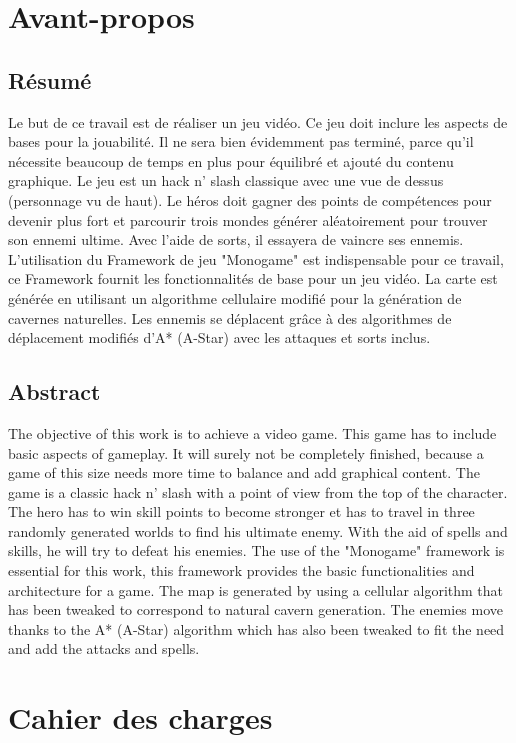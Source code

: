 \documentclass[11pt, a4paper, oneside]{report}
\begin{document}
\chapter{Avant-propos}
\section{Résumé}
Le but de ce travail est de réaliser un jeu vidéo. Ce jeu doit inclure les aspects de bases pour la jouabilité. Il ne sera bien évidemment pas terminé, parce qu'il nécessite beaucoup de temps en plus pour équilibré et ajouté du contenu graphique. Le jeu est un hack n' slash classique avec une vue de dessus (personnage vu de haut). Le héros doit gagner des points de compétences pour devenir plus fort et parcourir trois mondes générer aléatoirement pour trouver son ennemi ultime. Avec l'aide de sorts, il essayera de vaincre ses ennemis. L'utilisation du Framework de jeu "Monogame" est indispensable pour ce travail, ce Framework fournit les fonctionnalités de base pour un jeu vidéo. La carte est générée en utilisant un algorithme cellulaire modifié pour la génération de cavernes naturelles. Les ennemis se déplacent grâce à des algorithmes de déplacement modifiés d'A* (A-Star) avec les attaques et sorts inclus.

\section{Abstract}
The objective of this work is to achieve a video game. This game has to include basic aspects of gameplay. It will surely not be completely finished, because a game of this size needs more time to balance and add graphical content. The game is a classic hack n' slash with a point of view from the top of the character. The hero has to win skill points to become stronger et has to travel in three randomly generated worlds to find his ultimate enemy. With the aid of spells and skills, he will try to defeat his enemies. The use of the "Monogame" framework is essential for this work, this framework provides the basic functionalities and architecture for a game. The map is generated by using a cellular algorithm that has been tweaked to correspond to natural cavern generation. The enemies move thanks to the A* (A-Star) algorithm which has also been tweaked to fit the need and add the attacks and spells.

\newpage
\tableofcontents
\newpage
\chapter{Cahier des charges}
\end{document}
